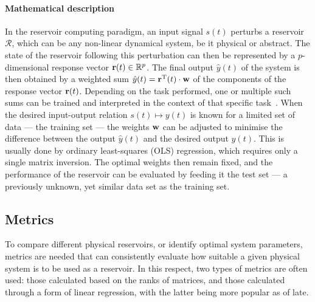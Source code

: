 \paragraph{Mathematical description}
In the reservoir computing paradigm, an input signal $s(t)$ perturbs a reservoir $\mathcal{R}$, which can be any non-linear dynamical system, be it physical or abstract.
The state of the reservoir following this perturbation can then be represented by a $p$-dimensional response vector $\boldsymbol{\mathbf{r}}(t) \in \mathbb{R}^p$.
The final output $\hat{y}(t)$ of the system is then obtained by a weighted sum $\hat{y}(t) = \boldsymbol{\mathbf{r}}^\mathrm{T}(t) \cdot \boldsymbol{\mathbf{w}}$ of the components of the response vector $\boldsymbol{\mathbf{r}}(t)$.
Depending on the task performed, one or multiple such sums can be trained and interpreted in the context of that specific task~\cite{RC_RecentAdvances}. %
When the desired input-output relation $s(t) \mapsto y(t)$ is known for a limited set of data --- the training set --- the weights $\boldsymbol{\mathbf{w}}$ can be adjusted to minimise the difference between the output $\hat{y}(t)$ and the desired output $y(t)$.
This is usually done by ordinary least-squares (OLS) regression, which requires only a single matrix inversion.
The optimal weights then remain fixed, and the performance of the reservoir can be evaluated by feeding it the test set --- a previously unknown, yet similar data set as the training set.


\subsection{Metrics} \label{sec:1:RC_metrics}
To compare different physical reservoirs, or identify optimal system parameters, metrics are needed that can consistently evaluate how suitable a given physical system is to be used as a reservoir.
In this respect, two types of metrics are often used: those calculated based on the ranks of matrices, and those calculated through a form of linear regression, with the latter being more popular as of late.

